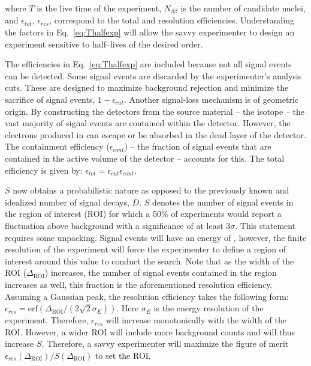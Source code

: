 where $T$ is the live time of the experiment, $N_{\beta\beta}$ is the number of \novbb{} candidate nuclei, and $\epsilon_{tot}$, $\epsilon_{res}$, correspond to the total and resolution efficiencies. Understanding the factors in Eq.~\ref{eq:Thalfexp} will allow the savvy experimenter to design an experiment sensitive to \novbb{} half--lives of the desired order. 

The efficiencies in Eq.~\ref{eq:Thalfexp} are included because not all signal events can be detected. Some signal events are discarded by the experimenter's analysis cuts. These are designed to maximize background rejection and minimize the sacrifice of signal events, $1 - \epsilon_{cut}$. Another signal-loss mechanism is of geometric origin. By constructing the detectors from the source material -- the \novbb{} isotope -- the vast majority of signal events are contained within the detector. However, the electrons produced in \novbb{} can escape or be absorbed in the dead layer of the detector. The containment efficiency ($\epsilon_{cont}$) -- the fraction of signal events that are contained in the active volume of the detector -- accounts for this. The total efficiency is given by: $\epsilon_{tot}=\epsilon_{cut}\epsilon_{cont}$.

$S$ now obtains a probabilistic nature as opposed to the previously known and idealized number of signal decays, $D$. $S$ denotes the number of signal events in the \novbb{} region of interest (ROI) for which a 50\% of experiments would report a fluctuation above background with a significance of at least 3$\sigma$. This statement requires some unpacking. Signal events will have an energy of \Qbb{}, however, the finite resolution of the experiment will force the experimenter to define a region of interest around this value to conduct the search.  Note that as the width of the ROI ($\Delta_{\text{ROI}}$) increases, the number of signal events contained in the region increases as well, this fraction is the aforementioned resolution efficiency. Assuming a Gaussian \novbb{} peak, the resolution efficiency takes the following form: $\epsilon_{res} = \text{erf}(\Delta_{\text{ROI}}/(2\sqrt2\sigma_E))$.  Here $\sigma_E$ is the energy resolution of the experiment. Therefore, $\epsilon_{res}$ will increase monotonically with the width of the ROI. However, a wider ROI will include more background counts and will thus increase $S$. Therefore, a savvy experimenter will maximize the figure of merit $\epsilon_{res}(\Delta_{\text{ROI}})/S(\Delta_{\text{ROI}})$ to set the ROI.

